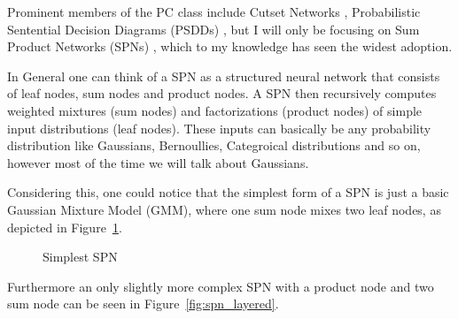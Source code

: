 Prominent members of the PC class include Cutset Networks \cite{cutset}, Probabilistic
Sentential Decision Diagrams (PSDDs) \cite{psdd}, but I will only be focusing on Sum Product Networks (SPNs) \cite{spn}, which to my 
knowledge has seen the widest adoption. 

In General one can think of a SPN as a structured neural network that consists of leaf nodes, sum nodes and product 
nodes. A SPN then recursively computes weighted mixtures (sum nodes) and factorizations (product nodes) of simple input distributions (leaf nodes). 
These inputs can basically be any probability distribution like Gaussians, Bernoullies, Categroical distributions and so on,
however most of the time we will talk about Gaussians.

Considering this, one could notice that the simplest form of a SPN is just a basic 
Gaussian Mixture Model (GMM), where one sum node mixes two leaf nodes, as depicted in Figure~\ref{fig:spn_gmm}.

\begin{figure}[h!]
    \centering
    \caption{Simplest SPN}
    \label{fig:spn_gmm}
\end{figure}
Furthermore an only slightly more complex SPN with a product node and two sum node can be seen in Figure~\ref{fig:spn_layered}. 

